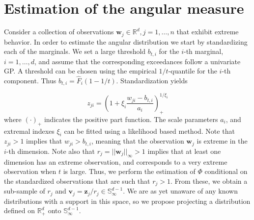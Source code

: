 \section{Estimation of the angular measure\label{sec:methodology}}

Consider a collection of observations $\bm{w}_j\in {\mathbb R}^d, j=1, \ldots , n$ that exhibit extreme behavior. In order to estimate the angular distribution we start by standardizing each of the marginals. We set a large threshold $b_{t,i}$ for the $i$-th marginal, $i=1, \ldots ,d$, and assume that the corresponding exceedances follow a univariate GP. A threshold can be chosen using the empirical $1/t$-quantile for the $i$-th component. Thus $b_{t,i} = \hat{F}_i(1 - 1/t)$. Standardization yields

\begin{equation}
    \label{eqn:standardization}
    z_{ji} = \left(1 + \xi_{i}\frac{w_{ji} - b_{t,i}}{a_{i}}\right)_{+}^{1/\xi_{i}}
\end{equation}
  where $(\cdot)_{+}$ indicates the positive part function. The scale parameters $a_{i}$, and extremal indexes $\xi_{i}$ can be fitted using a likelihood based method.
 Note that $z_{ji} > 1$ implies that $w_{ji} > b_{t,i}$, meaning that the observation
  $\bm{w}_j$ is extreme in the $i$-th dimension.  Note also that $r_j = ||\bm{w}_j||_\infty>1$ implies that at least one dimension has an extreme observation, and corresponds to a very extreme observation when $t$ is large. Thus, we perform the estimation of $\Phi$ conditional on the standardized observations that are such that $r_j>1$. From these, we obtain a sub-sample of $r_j$ and
  $\bm{v}_j = \bm{z}_j/r_j\in{\mathbb S}_{\infty}^{d-1}$. We are as yet unaware of any known distributions with a support
  in this space, so we propose projecting a distribution defined on ${\mathbb R}_{+}^{d}$ onto
  ${\mathbb S}_{\infty}^{d-1}$.

  

  

  
